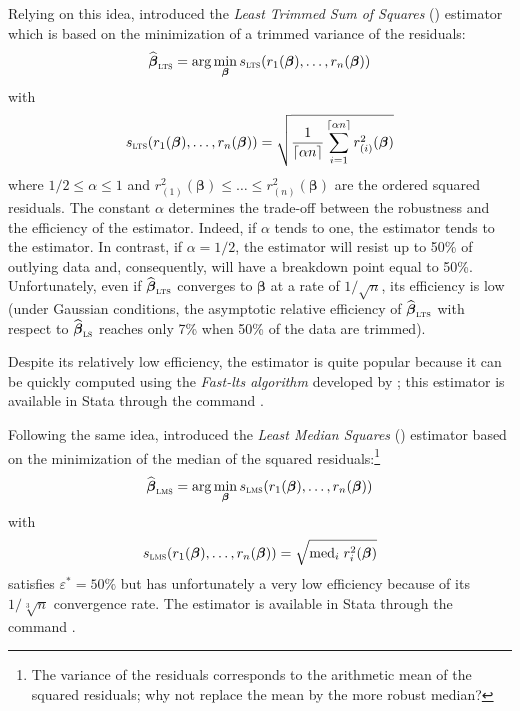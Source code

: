 Relying on this idea, \citet{Rousseeuw:1983} introduced the \emph{Least Trimmed
Sum of Squares} () estimator which is based on the minimization of a
trimmed variance of the residuals:
\[
    \sthat{\boldsymbol\beta}_{\stsc{LTS}}
     = \arg\min_{\boldsymbol\beta}s_{\stsc{LTS}}(r_{1}(\boldsymbol\beta), \dots, r_{n}(\boldsymbol\beta))
\]
with
\[
    s_{\stsc{LTS}}(r_{1}(\boldsymbol\beta), \dots, r_{n}(\boldsymbol\beta))
    = \sqrt{\frac{1}{\lceil\alpha n\rceil} 
      \sum_{i=1}^{\lceil\alpha n\rceil}r_{(i)}^{2}(\boldsymbol\beta)}
\]
where $1/2 \leq \alpha \leq 1$ and $r_{(1)}^{2}(\boldsymbol\beta) \leq \dots
\leq r_{(n)}^{2}(\boldsymbol\beta)$ are the ordered squared residuals. The
constant $\alpha$ determines the trade-off between the robustness and the
efficiency of the estimator. Indeed, if $\alpha$ tends to one, the 
estimator tends to the  estimator. In contrast, if $\alpha = 1/2$, the
 estimator will resist up to 50\% of outlying data and, consequently,
will have a breakdown point equal to 50\%. Unfortunately, even if
$\sthat{\boldsymbol\beta}_{\stsc{LTS}}$ converges to $\boldsymbol\beta$ at a
rate of $1/\sqrt{n}$, its efficiency is low (under Gaussian conditions, the
asymptotic relative efficiency of $\sthat{\boldsymbol\beta}_{\stsc{LTS}}$ with
respect to $\sthat{\boldsymbol\beta}_{\stsc{LS}}$ reaches only 7\% when 50\% of
the data are trimmed).

Despite its relatively low efficiency, the  estimator is quite popular
because it can be quickly computed using the \emph{Fast-lts algorithm}
developed by \citet{rousseeuw&vdriessen99}; this estimator is available in
Stata through the command .

Following the same idea, \citet{rousseeuw:1984} introduced the \emph{Least Median
Squares} () estimator based on the minimization of the median of
the squared residuals:\footnote{The variance of the residuals corresponds to
the arithmetic mean of the squared residuals; why not replace the mean by the
more robust median?}
\[
    \sthat{\boldsymbol\beta}_{\stsc{LMS}} 
    = \arg\min_{\boldsymbol\beta} s_{\stsc{LMS}}(r_{1}(\boldsymbol\beta), \dots, r_{n}(\boldsymbol\beta))
\]
with
\[
    s_{\stsc{LMS}}(r_{1}(\boldsymbol\beta), \dots, r_{n}(\boldsymbol\beta)) 
    = \sqrt{\mathrm{med}_{i}\;r_{i}^{2}(\boldsymbol\beta)}
\]
 satisfies $\varepsilon^* = 50\%$ but has unfortunately a very low
efficiency because of its $1/\sqrt[3]{n}$ convergence rate. The 
estimator is available in Stata through the command .

